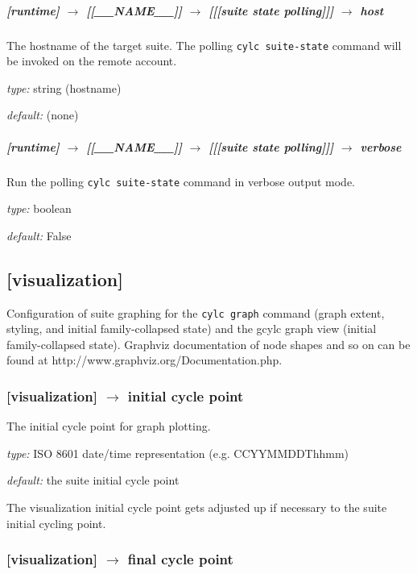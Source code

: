 \subparagraph[host]{[runtime] $\rightarrow$ [[\_\_NAME\_\_]] $\rightarrow$ [[[suite state polling]]] $\rightarrow$ host}

The hostname of the target suite. The polling \lstinline=cylc suite-state= command
will be invoked on the remote account.

\begin{myitemize}
    \item {\em type:} string (hostname)
    \item {\em default:} (none)
\end{myitemize}

\subparagraph[verbose]{[runtime] $\rightarrow$ [[\_\_NAME\_\_]] $\rightarrow$ [[[suite state polling]]] $\rightarrow$ verbose}

Run the polling \lstinline=cylc suite-state= command in verbose output mode.

\begin{myitemize}
    \item {\em type:} boolean
    \item {\em default:} False
\end{myitemize}

\subsection{[visualization]}

Configuration of suite graphing for the \lstinline=cylc graph= command (graph
extent, styling, and initial family-collapsed state) and the gcylc graph view
(initial family-collapsed state). Graphviz documentation of node shapes
and so on can be found at http://www.graphviz.org/Documentation.php.

\subsubsection[initial cycle point]{[visualization] $\rightarrow$ initial cycle point}

The initial cycle point for graph plotting.
\begin{myitemize}
    \item {\em type:} ISO 8601 date/time representation (e.g. CCYYMMDDThhmm)
    \item {\em default:} the suite initial cycle point
\end{myitemize}
The visualization initial cycle point gets adjusted up if necessary to the
suite initial cycling point.

\subsubsection[final cycle point]{[visualization] $\rightarrow$ final cycle point}

